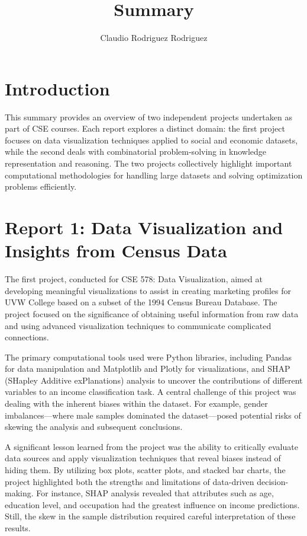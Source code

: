 \documentclass{IEEEtran}
\begin{document}
\title{Summary}
\author{Claudio Rodriguez Rodriguez}
\maketitle


\section{Introduction}
This summary provides an overview of two independent projects undertaken as part of CSE courses. Each report explores a distinct domain: the first project focuses on data visualization techniques applied to social and economic datasets, while the second deals with combinatorial problem-solving in knowledge representation and reasoning. The two projects collectively highlight important computational methodologies for handling large datasets and solving optimization problems efficiently.

\section{Report 1: Data Visualization and Insights from Census Data}
The first project, conducted for CSE 578: Data Visualization, aimed at developing meaningful visualizations to assist in creating marketing profiles for UVW College based on a subset of the 1994 Census Bureau Database. The project focused on the significance of obtaining useful information from raw data and using advanced visualization techniques to communicate complicated connections.

The primary computational tools used were Python libraries, including Pandas for data manipulation and Matplotlib and Plotly for visualizations, and SHAP (SHapley Additive exPlanations) analysis to uncover the contributions of different variables to an income classification task. A central challenge of this project was dealing with the inherent biases within the dataset. For example, gender imbalances—where male samples dominated the dataset—posed potential risks of skewing the analysis and subsequent conclusions. 

A significant lesson learned from the project was the ability to critically evaluate data sources and apply visualization techniques that reveal biases instead of hiding them. By utilizing box plots, scatter plots, and stacked bar charts, the project highlighted both the strengths and limitations of data-driven decision-making. For instance, SHAP analysis revealed that attributes such as age, education level, and occupation had the greatest influence on income predictions. Still, the skew in the sample distribution required careful interpretation of these results.
\end{document}
